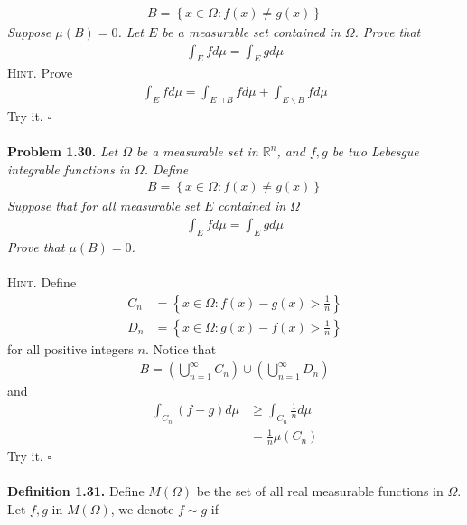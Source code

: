 \documentclass[a4paper]{article}
\numberwithin{equation}{section}
\begin{document}
\begin{align}
B = \left\{ {x \in \Omega :f\left( x \right) \ne g\left( x \right)} \right\}
\end{align}
\textit{Suppose $\mu \left(B\right)=0$. Let $E$ be a measurable set contained in $\Omega$. Prove that}
\begin{align}
\int_E {fd\mu }  = \int_E {gd\mu } 
\end{align}
\textsc{Hint.} Prove
\begin{align}
\int_E {fd\mu }  = \int_{E \cap B} {fd\mu }  + \int_{E\backslash B} {fd\mu } 
\end{align}
Try it. \hfill $\square$\\
\\
\textbf{Problem 1.30.} \textit{Let $\Omega$ be a measurable set in $\mathbb{R}^n$, and $f,g$ be two Lebesgue integrable functions in $\Omega$. Define}
\begin{align}
B = \left\{ {x \in \Omega :f\left( x \right) \ne g\left( x \right)} \right\}
\end{align}
\textit{Suppose that for all measurable set $E$ contained in $\Omega$}
\begin{align}
\int_E {fd\mu }  = \int_E {gd\mu } 
\end{align}
\textit{Prove that $\mu \left(B\right)=0$.}\\
\\
\textsc{Hint.} Define
\begin{align}
{C_n} &= \left\{ {x \in \Omega :f\left( x \right) - g\left( x \right) > \frac{1}{n}} \right\}\\
{D_n} &= \left\{ {x \in \Omega :g\left( x \right) - f\left( x \right) > \frac{1}{n}} \right\}
\end{align}
for all positive integers $n$. Notice that
\begin{align}
B = \left( {\bigcup\limits_{n = 1}^\infty  {{C_n}} } \right) \cup \left( {\bigcup\limits_{n = 1}^\infty  {{D_n}} } \right)
\end{align}
and
\begin{align}
\int_{{C_n}} {\left( {f - g} \right)d\mu }  &\ge \int_{{C_n}} {\frac{1}{n}d\mu } \\
& = \frac{1}{n}\mu \left( {{C_n}} \right)
\end{align}
Try it. \hfill $\square$\\
\\
\textbf{Definition 1.31.} Define $M\left(\Omega\right)$ be the set of all real measurable functions in $\Omega$. Let $f,g$ in $M\left(\Omega\right)$, we denote $f \sim g$ if
\end{document}
